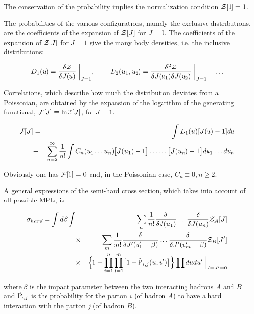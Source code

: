 \documentclass{ws-rv9x6}
\begin{document}
\noindent The conservation of the probability implies the
normalization condition ${\cal Z}[1]=1$.

\noindent The probabilities of the various configurations, namely the  exclusive
distributions, are the coefficients of the expansion of ${\cal
Z}[J]$ for $J=0$. The coefficients of the expansion of ${\cal
Z}[J]$ for $J=1$ give the many body densities, i.e. the inclusive
distributions:

\begin{eqnarray}\label{incl.distr}D_1(u)={\delta{\cal Z}\over \delta J(u)}\biggm|_{J=1},\quad
                 \quad\
     D_2(u_1,u_2)={\delta^2{\cal Z}\over \delta J(u_1)\delta J(u_2)}
                  \biggm|_{J=1}\quad\dots\end{eqnarray}

\noindent Correlations, which describe how much the distribution deviates from a
Poissonian, are obtained by the expansion of the logarithm of the generating
functional, ${\cal F}[J]\equiv{\rm ln}{\cal Z}[J]$, for $J=1$:

\begin{eqnarray}{\cal F}[J]&=&\int D_1(u)[J(u)-1]du\cr
&+&\sum_{n=2}^{\infty}{1\over n!}
\int C_n(u_1\dots u_n)\bigl[J(u_1)-1\bigr]\dots
  \dots\bigl[J(u_n)-1\bigr]
du_1\dots du_n
\nonumber
\end{eqnarray}

\noindent  Obviously one has ${\cal F}[1]=0$ and, in the
Poissonian case, $C_n\equiv 0, n\ge 2$.

\noindent  A general
expressions of the semi-hard cross section, which takes into
account of all possible MPIs, is

\begin{eqnarray}\label{sigma hard}\sigma_{hard}=\int d\beta\int&&\sum_n{1\over n!}
  {\delta\over \delta J(u_1)}\dots
  {\delta\over \delta J(u_n)}{\cal Z}_A[J]\nonumber\\
  &\times&\sum_m{1\over m!}
  {\delta\over \delta J'(u_1'-\beta)}\dots
  {\delta\over \delta J'(u_m'-\beta)}{\cal Z}_B[J']\\
&\times&\Bigl\{1-\prod_{i=1}^n\prod_{j=1}^m\bigl[1-\hat{\rm P}_{i,j}(u,u')\bigr]
   \Bigr\}\prod dudu'\Bigm|_{J=J'=0}\nonumber
\end{eqnarray}

\noindent where $\beta$ is the impact parameter between the two
interacting hadrons $A$ and $B$ and $\hat{\rm P}_{i,j}$ is the
probability for the parton $i$ (of hadron $A$) to have a hard
interaction with the parton $j$ (of hadron $B$).
\end{document}
